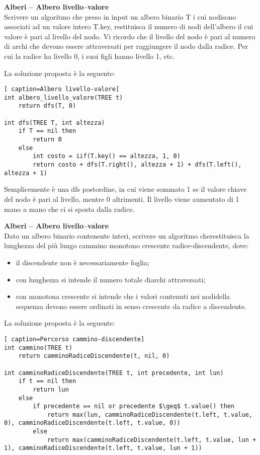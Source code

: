 \documentclass[../cheatSheetAlgoritmi.tex]{subfiles}
\begin{document}
\textbf{Alberi – Albero livello–valore}\\
Scrivere un algoritmo che preso in input un albero binario T i cui nodisono associati ad un valore intero T.key, restituisca il numero di nodi dell’albero il cui valore è pari al livello del nodo. Vi ricordo che il livello del nodo è pari al numero di archi che devono essere attraversati per raggiungere il nodo dalla radice. Per cui la radice ha livello 0, i suoi figli hanno livello 1, etc.

\bigskip
La soluzione proposta è la seguente:
\begin{lstlisting}[ caption=Albero livello-valore]
int albero_livello_valore(TREE t)
	return dfs(T, 0)

int dfs(TREE T, int altezza)
	if T == nil then
   		return 0
  	else
		int costo = iif(T.key() == altezza, 1, 0)  	
  		return costo + dfs(T.right(), altezza + 1) + dfs(T.left(), altezza + 1)
\end{lstlisting}

Semplicemente è una dfs postordine, in cui viene sommato 1 se il valore chiave del nodo è pari al livello, mentre 0 altrimenti. Il livello viene aumentato di 1 mano a mano che ci si sposta dalla radice.

\bigskip
\textbf{Alberi – Albero livello–valore}\\
Dato un albero binario contenente interi, scrivere un algoritmo cherestituisca la lunghezza del più lungo cammino monotono crescente radice-discendente, dove:
\begin{itemize}
	\item il discendente non è necessariamente foglia;
	\item con lunghezza si intende il numero totale diarchi attraversati;
	\item con monotona crescente si intende che i valori contenuti nei nodidella sequenza devono essere ordinati in senso crescente da radice a discendente.
\end{itemize}

La soluzione proposta è la seguente:
\begin{lstlisting}[ caption=Percorso cammino-discendente]
int cammino(TREE t)
	return camminoRadiceDiscendente(t, nil, 0)

int camminoRadiceDiscendente(TREE t, int precedente, int lun)
  	if t == nil then
   		return lun
  	else
    	if precedente == nil or precedente $\geq$ t.value() then
      		return max(lun, camminoRadiceDiscendente(t.left, t.value, 0), camminoRadiceDiscendente(t.left, t.value, 0))
    	else
      		return max(camminoRadiceDiscendente(t.left, t.value, lun + 1), camminoRadiceDiscendente(t.left, t.value, lun + 1))
\end{lstlisting}
\end{document}
